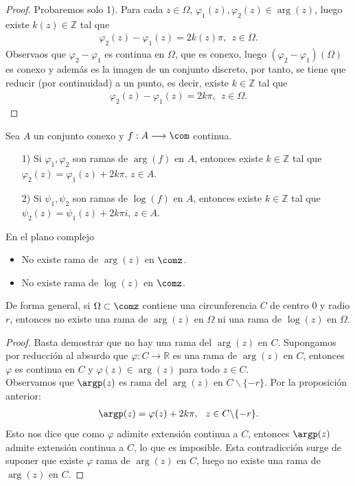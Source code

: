 \begin{proof}
Probaremos solo 1). Para cada $z \in \Omega$, $\varphi_1(z), \varphi_2(z) \in \arg(z)$, luego existe $k(z) \in \mathbb{Z}$ tal que 
\begin{align*}
    \varphi_2(z) - \varphi_1(z) = 2k(z)\pi, \ \ z \in \Omega.
\end{align*}
Observaos que $\varphi_2 - \varphi_1$ es continua en $\Omega$, que es conexo, luego $(\varphi_2 - \varphi_1)(\Omega)$ es conexo y además es la imagen de un conjunto discreto, por tanto, se tiene que reducir (por continuidad) a un punto, es decir, existe $k \in \mathbb{Z}$ tal que
\begin{align*}
    \varphi_2(z) - \varphi_1(z) = 2k\pi, \ \ z \in \Omega.
\end{align*}
\end{proof}

\begin{prop}
Sea $A$ un conjunto conexo y $ f: A \longrightarrow \com$ continua.
\begin{enumerate}
    \item[1)] Si $\varphi_1,\varphi_2$ son ramas de $\arg(f)$ en $A$, entonces existe $k \in \mathbb{Z}$ tal que $\varphi_2(z) = \varphi_1(z) + 2k\pi$, $z \in A$.
    \item[2)] Si $\psi_1,\psi_2$ son ramas de $\log(f)$ en $A$, entonces existe $k \in \mathbb{Z}$ tal que $\psi_2(z) = \psi_1(z) + 2k\pi i$, $z \in A$.
\end{enumerate}
\end{prop}

\begin{prop}
En el plano complejo
\begin{itemize}
    \item No existe rama de $\arg(z)$ en $\comz$.
    \item No existe rama de $\log(z)$ en $\comz$.
\end{itemize}
De forma general, si $\Omega \subset \comz$ contiene una circunferencia $C$ de centro $0$ y radio $r$, entonces no existe una rama de $\arg(z)$ en $\Omega$ ni una rama de $\log(z)$ en $\Omega$.
\end{prop}

\begin{proof}
Basta demostrar que no hay una rama del $\arg(z)$ en $C$. Supongamos por reducción al absurdo que $\varphi: C \longrightarrow \mathbb{R}$ es una rama de $\arg(z)$ en $C$, entonces $\varphi$ es continua en $C$ y $\varphi(z) \in \arg(z)$ para todo $z \in C$.
\\
\newline
Observamos que $\argp(z)$ es rama del $\arg(z)$ en $C \backslash \{ -r \}$. Por la proposición anterior:
\begin{align*}
    \argp(z) = \varphi(z) + 2k\pi, \ \ z \in C \backslash \{-r\}.
\end{align*}
Esto nos dice que como $\varphi$ adimite extensión continua a $C$, entonces $\argp(z)$ admite extensión continua a $C$, lo que es imposible. Esta contradicción surge de suponer que existe $\varphi$ rama de $\arg(z)$ en $C$, luego no existe una rama de $\arg(z)$ en $C$.
\end{proof}

